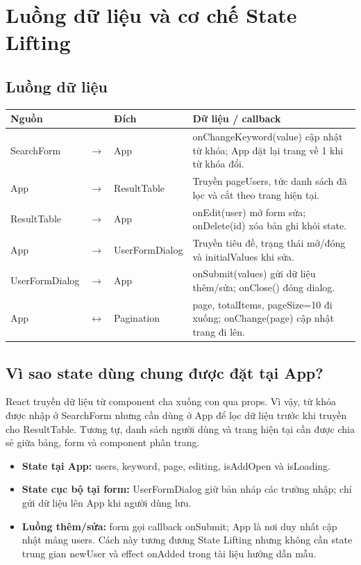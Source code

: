 \documentclass[12pt,a4paper]{article}
\newcommand{\code}[1]{\textsf{\small #1}}
\begin{document}
\section{Luồng dữ liệu và cơ chế State Lifting}

\subsection{Luồng dữ liệu}

\begin{tabularx}{\textwidth}{@{}L{3.1cm} c L{3.1cm} Y@{}}
\toprule
\textbf{Nguồn} & & \textbf{Đích} & \textbf{Dữ liệu / callback} \\
\midrule
\code{SearchForm} & $\rightarrow$ & \code{App} & \code{onChangeKeyword(value)} cập nhật từ khóa; \code{App} đặt lại trang về 1 khi từ khóa đổi. \\
\code{App} & $\rightarrow$ & \code{ResultTable} & Truyền \code{pageUsers}, tức danh sách đã lọc và cắt theo trang hiện tại. \\
\code{ResultTable} & $\rightarrow$ & \code{App} & \code{onEdit(user)} mở form sửa; \code{onDelete(id)} xóa bản ghi khỏi state. \\
\code{App} & $\rightarrow$ & \code{UserFormDialog} & Truyền tiêu đề, trạng thái mở/đóng và \code{initialValues} khi sửa. \\
\code{UserFormDialog} & $\rightarrow$ & \code{App} & \code{onSubmit(values)} gửi dữ liệu thêm/sửa; \code{onClose()} đóng dialog. \\
\code{App} & $\leftrightarrow$ & \code{Pagination} & \code{page}, \code{totalItems}, \code{pageSize=10} đi xuống; \code{onChange(page)} cập nhật trang đi lên. \\
\bottomrule
\end{tabularx}

\subsection{Vì sao state dùng chung được đặt tại \code{App}?}

React truyền dữ liệu từ component cha xuống con qua props. Vì vậy, từ khóa được nhập ở \code{SearchForm} nhưng cần dùng ở \code{App} để lọc dữ liệu trước khi truyền cho \code{ResultTable}. Tương tự, danh sách người dùng và trang hiện tại cần được chia sẻ giữa bảng, form và component phân trang.

\begin{itemize}
  \item \textbf{State tại \code{App}:} \code{users}, \code{keyword}, \code{page}, \code{editing}, \code{isAddOpen} và \code{isLoading}.
  \item \textbf{State cục bộ tại form:} \code{UserFormDialog} giữ bản nháp các trường nhập; chỉ gửi dữ liệu lên \code{App} khi người dùng lưu.
  \item \textbf{Luồng thêm/sửa:} form gọi callback \code{onSubmit}; \code{App} là nơi duy nhất cập nhật mảng \code{users}. Cách này tương đương State Lifting nhưng không cần state trung gian \code{newUser} và effect \code{onAdded} trong tài liệu hướng dẫn mẫu.
\end{itemize}
\end{document}

